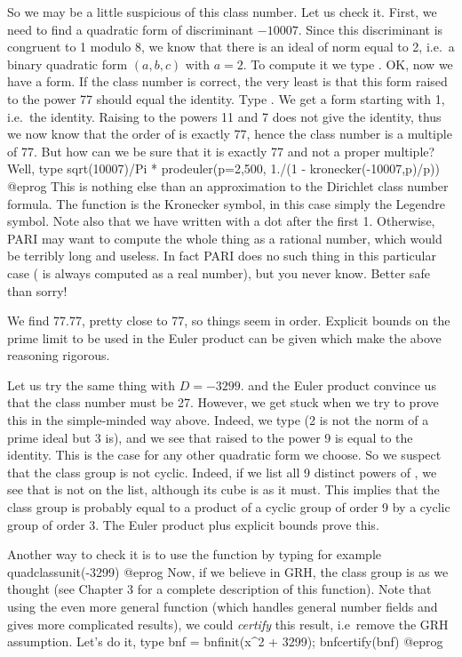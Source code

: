 So we may be a little suspicious of this class number. Let us check it.
First, we need to find a quadratic form of discriminant $-10007$. Since this
discriminant is congruent to 1 modulo 8, we know that there is an ideal of
norm equal to 2, i.e.~a binary quadratic form $(a,b,c)$ with $a=2$. To
compute it we type . OK, now we have a form.
If the class number is correct, the very least is that this form raised to
the power 77 should equal the identity. Type . We get a form
starting with 1, i.e.~the identity. Raising  to the powers 11 and 7
does not give the identity, thus we now know that the order of  is
exactly 77, hence the class number is a multiple of 77. But how can we be
sure that it is exactly 77 and not a proper multiple? Well, type
\bprog
  sqrt(10007)/Pi * prodeuler(p=2,500, 1./(1 - kronecker(-10007,p)/p))
@eprog\noindent
This is nothing else than an approximation to the Dirichlet class number
formula. The function  is the Kronecker symbol, in this case
simply the Legendre symbol. Note also that we have written 
with a dot after the first 1. Otherwise, PARI may want to compute the whole
thing as a rational number, which would be terribly long and useless. In fact
PARI does no such thing in this particular case ( is always
computed as a real number), but you never know. Better safe than sorry!

We find 77.77, pretty close to 77, so things seem in order. Explicit bounds
on the prime limit to be used in the Euler product can be given which make
the above reasoning rigorous.

Let us try the same thing with $D=-3299$.  and the Euler
product convince us that the class number must be 27. However, we get stuck
when we try to prove this in the simple-minded way above. Indeed, we type
 (2 is not the norm of a prime ideal but
3 is), and we see that  raised to the power 9 is equal to the identity.
This is the case for any other quadratic form we choose. So we suspect that the
class group is not cyclic. Indeed, if we list all 9 distinct powers of ,
we see that  is not on the list, although its cube
is as it must. This implies that the class group is probably equal to a
product of a cyclic group of order 9 by a cyclic group of order 3. The Euler
product plus explicit bounds prove this.

Another way to check it is to use the  function by typing
for example
\bprog
  quadclassunit(-3299)
@eprog\noindent
Now, if we believe in GRH, the class group is as we thought (see Chapter 3
for a complete description of this function). Note that using the even more
general function  (which handles general number fields and gives
more complicated results), we could \emph{certify} this result, i.e~remove
the GRH assumption. Let's do it, type
\bprog
  bnf = bnfinit(x^2 + 3299); bnfcertify(bnf)
@eprog

